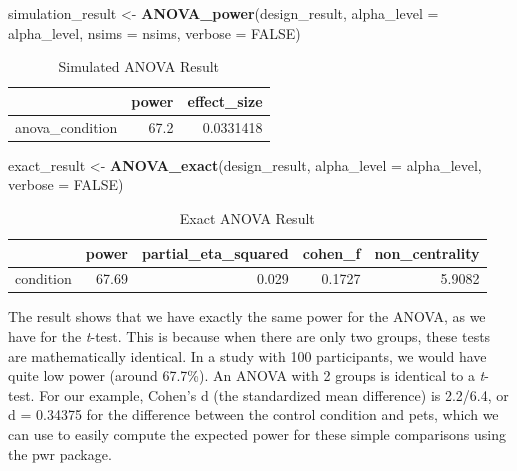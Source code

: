 \documentclass[]{book}
\newenvironment{Shaded}{\begin{snugshade}}{\end{snugshade}}
\newcommand{\DataTypeTok}[1]{\textcolor[rgb]{0.13,0.29,0.53}{#1}}
\newcommand{\KeywordTok}[1]{\textcolor[rgb]{0.13,0.29,0.53}{\textbf{#1}}}
\newcommand{\NormalTok}[1]{#1}
\newcommand{\OtherTok}[1]{\textcolor[rgb]{0.56,0.35,0.01}{#1}}
\newcommand{\StringTok}[1]{\textcolor[rgb]{0.31,0.60,0.02}{#1}}
\begin{document}
\begin{Shaded}
\begin{Highlighting}[]
\NormalTok{simulation_result <-}\StringTok{ }\KeywordTok{ANOVA_power}\NormalTok{(design_result, }
                                 \DataTypeTok{alpha_level =}\NormalTok{ alpha_level, }
                                 \DataTypeTok{nsims =}\NormalTok{ nsims,}
                                 \DataTypeTok{verbose =} \OtherTok{FALSE}\NormalTok{)}
\end{Highlighting}
\end{Shaded}

\begin{table}[!h]

\caption{\label{tab:unnamed-chunk-9}Simulated ANOVA Result}
\centering
\begin{tabular}{l|r|r}
\hline
  & power & effect\_size\\
\hline
anova\_condition & 67.2 & 0.0331418\\
\hline
\end{tabular}
\end{table}

\begin{Shaded}
\begin{Highlighting}[]
\NormalTok{exact_result <-}\StringTok{ }\KeywordTok{ANOVA_exact}\NormalTok{(design_result,}
                            \DataTypeTok{alpha_level =}\NormalTok{ alpha_level,}
                            \DataTypeTok{verbose =} \OtherTok{FALSE}\NormalTok{)}
\end{Highlighting}
\end{Shaded}

\begin{table}[!h]

\caption{\label{tab:unnamed-chunk-11}Exact ANOVA Result}
\centering
\begin{tabular}{l|r|r|r|r}
\hline
  & power & partial\_eta\_squared & cohen\_f & non\_centrality\\
\hline
condition & 67.69 & 0.029 & 0.1727 & 5.9082\\
\hline
\end{tabular}
\end{table}

The result shows that we have exactly the same power for the ANOVA, as we have for the \emph{t}-test. This is because when there are only two groups, these tests are mathematically identical. In a study with 100 participants, we would have quite low power (around 67.7\%). An ANOVA with 2 groups is identical to a \emph{t}-test. For our example, Cohen's d (the standardized mean difference) is 2.2/6.4, or d = 0.34375 for the difference between the control condition and pets, which we can use to easily compute the expected power for these simple comparisons using the pwr package.
\end{document}
